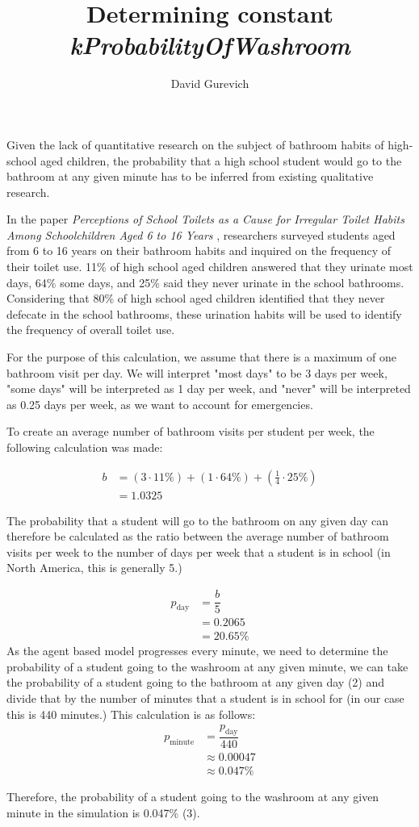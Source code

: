 \documentclass[preview, border=12pt, varwidth]{article}
\title{Determining constant \textit{kProbabilityOfWashroom}}
\author{David Gurevich}
\date{}
\begin{document}
\maketitle

Given the lack of quantitative research on the subject of bathroom habits of high-school aged children, the probability that a high school student would go to the bathroom at any given minute has to be inferred from existing qualitative research.

In the paper \textit{Perceptions of School Toilets as a Cause for Irregular Toilet Habits Among Schoolchildren Aged 6 to 16 Years} \cite{lundblad2005perceptions}, researchers surveyed students aged from 6 to 16 years on their bathroom habits and inquired on the frequency of their toilet use. 11\% of high school aged children answered that they urinate most days, 64\% some days, and 25\% said they never urinate in the school bathrooms. Considering that 80\% of high school aged children identified that they never defecate in the school bathrooms, these urination habits will be used to identify the frequency of overall toilet use.

For the purpose of this calculation, we assume that there is a maximum of one bathroom visit per day. We will interpret "most days" to be 3 days per week, "some days" will be interpreted as 1 day per week, and "never" will be interpreted as 0.25 days per week, as we want to account for emergencies.

To create an average number of bathroom visits per student per week, the following calculation was made:


\begin{align}
b &= (3 \cdot 11\%) + (1 \cdot 64\%) + (\frac{1}{4} \cdot 25\%) \nonumber \\
  &= 1.0325
\end{align}

The probability that a student will go to the bathroom on any given day can therefore be calculated as the ratio between the average number of bathroom visits per week to the number of days per week that a student is in school (in North America, this is generally 5.)

\begin{align}
p_{\text{day}} &= \dfrac{b}{5} \nonumber \\ 
&= 0.2065 \nonumber \\
&= 20.65 \% 
\end{align}
\newpage
As the agent based model progresses every minute, we need to determine the probability of a student going to the washroom at any given minute, we can take the probability of a student going to the bathroom at any given day (2) and divide that by the number of minutes that a student is in school for (in our case this is 440 minutes.) This calculation is as follows:
\begin{align}
p_{\text{minute}} &= \dfrac{p_{\text{day}}}{440} \nonumber \\
&\approx 0.00047 \nonumber \\
&\approx 0.047\%
\end{align}

Therefore, the probability of a student going to the washroom at any given minute in the simulation is 0.047\% (3).


\end{document}
